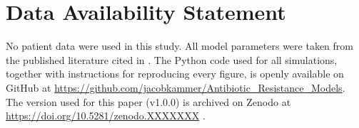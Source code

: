 \documentclass[utf8]{FrontiersinHarvard} %
\begin{document}
\section*{Data Availability Statement}
No patient data were used in this study. All model parameters were taken
from the published literature cited in .
The Python code used for all simulations, together with instructions for
reproducing every figure, is openly available on GitHub at
\url{https://github.com/jacobkammer/Antibiotic_Resistance_Models}.
The version used for this paper (v1.0.0) is archived on Zenodo at
\url{https://doi.org/10.5281/zenodo.XXXXXXX} \citep{Kammer2026code}.



\end{document}
